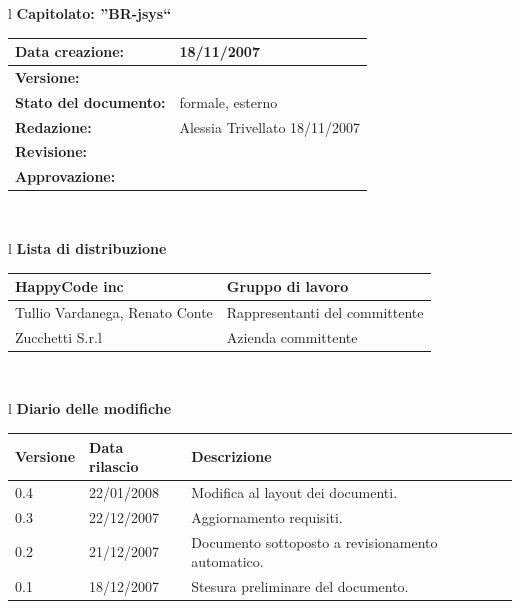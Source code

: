 \documentclass[11pt,titlepage,a4paper]{report}
\begin{document}
\begin{center}
\thispagestyle{plain}
\begin{table}[htbp]
\large{
\begin{tabular}{l}
\Large{\textbf{\textsf{Capitolato: ''BR-jsys``}}} \\
\begin{tabular}{||p{6cm}||p{6cm}||} \hline
\textbf{Data creazione:} & 18/11/2007 \\ \hline
\textbf{Versione:} & \lv \\ \hline
\textbf{Stato del documento:} & formale, esterno \\ \hline
\textbf{Redazione:} & Alessia Trivellato ­18/11/2007 \\ \hline
\textbf{Revisione:} &    \\ \hline
\textbf{Approvazione:}  & \\ \hline
\end{tabular} \\
\end{tabular}
}
\end{table}
\begin{table}[hbtp]
\large{
\begin{tabular}{l}
\Large{\textbf{\textsf{Lista di distribuzione}}} \\
\begin{tabular}{||p{6cm}||p{6cm}||} \hline
{HappyCode inc}& Gruppo di lavoro\\ \hline
{Tullio Vardanega, Renato Conte}& Rappresentanti del committente \\ \hline 
{Zucchetti S.r.l}& Azienda committente\\ \hline
\end{tabular} \\
\end{tabular}
}
\end{table}

\begin{table}[hbtp]
\large{
\begin{tabular}{l}
\Large{\textbf{\textsf{Diario delle modifiche}}} \\
\begin{tabular}{||p{2cm}||p{3.5cm}||p{6cm}||} \hline
\textbf{Versione} & \textbf{Data rilascio} & \textbf{Descrizione} \\ \hline
0.4 & 22/01/2008 & Modifica al layout dei documenti.\\ \hline
0.3 & 22/12/2007 & Aggiornamento requisiti. \\ \hline \hline
0.2 & 21/12/2007 & Documento sottoposto a revisionamento automatico.\\ \hline
0.1 & 18/12/2007 & Stesura preliminare del documento. \\ \hline

\end{tabular} \\
\end{tabular}

}
\end{table}
\end{center}
\end{document}
